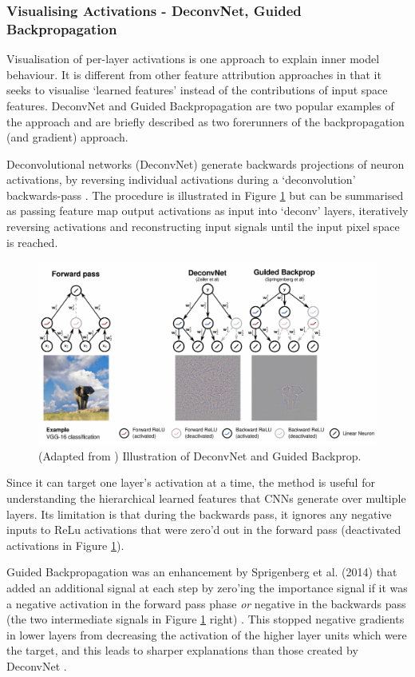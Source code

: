 \documentclass[main]{subfiles}
\begin{document}
\subsubsection{Visualising Activations - DeconvNet, Guided Backpropagation}
Visualisation of per-layer activations is one approach to explain inner model behaviour. It is different from other feature attribution approaches in that it seeks to visualise `learned features' instead of the contributions of input space features. DeconvNet and Guided Backpropagation are two popular examples of the approach and are briefly described as two forerunners of the backpropagation (and gradient) approach.

Deconvolutional networks (DeconvNet) generate backwards projections of neuron activations, by reversing individual activations during a `deconvolution' backwards-pass \cite{zeilerfergus2013}. The procedure is illustrated in Figure \ref{deconvimg} but can be summarised as passing feature map output activations as input into `deconv' layers, iteratively reversing activations and reconstructing input signals until the input pixel space is reached.

\begin{figure}[h]
\centering
\includegraphics[scale=0.3]{deconv.png}
\caption{(Adapted from \cite{patternnet}) Illustration of DeconvNet and Guided Backprop.}
\label{deconvimg}
\end{figure}

Since it can target one layer's activation at a time, the method is useful for understanding the hierarchical learned features that CNNs generate over multiple layers. Its limitation is that during the backwards pass, it ignores any negative inputs to ReLu activations that were zero'd out in the forward pass (deactivated activations in Figure \ref{deconvimg}).

Guided Backpropagation was an enhancement by Sprigenberg et al. (2014) that added an additional signal at each step by zero'ing the importance signal if it was a negative activation in the forward pass phase \textit{or} negative in the backwards pass (the two intermediate signals in Figure \ref{deconvimg} right) \cite{springenberg}. This stopped negative gradients in lower layers from decreasing the activation of the higher layer units which were the target, and this leads to sharper explanations than those created by DeconvNet \cite{springenberg}. 
\end{document}

